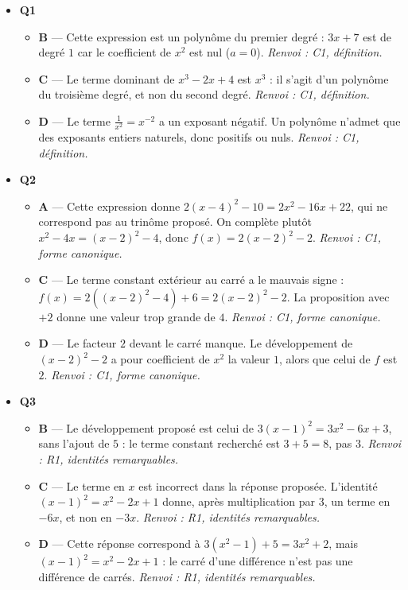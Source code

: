 \begin{itemize}
  \item \textbf{Q1}
  \begin{itemize}
    \item \textbf{B} — Cette expression est un polynôme du premier degré : $3x+7$ est de degré $1$ car le coefficient de $x^2$ est nul ($a=0$). \emph{Renvoi : C1, définition.}
    \item \textbf{C} — Le terme dominant de $x^3-2x+4$ est $x^3$ : il s’agit d’un polynôme du troisième degré, et non du second degré. \emph{Renvoi : C1, définition.}
    \item \textbf{D} — Le terme $\frac{1}{x^2}=x^{-2}$ a un exposant négatif. Un polynôme n’admet que des exposants entiers naturels, donc positifs ou nuls. \emph{Renvoi : C1, définition.}
  \end{itemize}
  \item \textbf{Q2}
  \begin{itemize}
    \item \textbf{A} — Cette expression donne $2(x-4)^2-10=2x^2-16x+22$, qui ne correspond pas au trinôme proposé. On complète plutôt $x^2-4x=(x-2)^2-4$, donc $f(x)=2(x-2)^2-2$. \emph{Renvoi : C1, forme canonique.}
    \item \textbf{C} — Le terme constant extérieur au carré a le mauvais signe : $f(x)=2((x-2)^2-4)+6=2(x-2)^2-2$. La proposition avec $+2$ donne une valeur trop grande de $4$. \emph{Renvoi : C1, forme canonique.}
    \item \textbf{D} — Le facteur $2$ devant le carré manque. Le développement de $(x-2)^2-2$ a pour coefficient de $x^2$ la valeur $1$, alors que celui de $f$ est $2$. \emph{Renvoi : C1, forme canonique.}
  \end{itemize}
  \item \textbf{Q3}
  \begin{itemize}
    \item \textbf{B} — Le développement proposé est celui de $3(x-1)^2=3x^2-6x+3$, sans l’ajout de $5$ : le terme constant recherché est $3+5=8$, pas $3$. \emph{Renvoi : R1, identités remarquables.}
    \item \textbf{C} — Le terme en $x$ est incorrect dans la réponse proposée. L’identité $(x-1)^2=x^2-2x+1$ donne, après multiplication par $3$, un terme en $-6x$, et non en $-3x$. \emph{Renvoi : R1, identités remarquables.}
    \item \textbf{D} — Cette réponse correspond à $3(x^2-1)+5=3x^2+2$, mais $(x-1)^2=x^2-2x+1$ : le carré d’une différence n’est pas une différence de carrés. \emph{Renvoi : R1, identités remarquables.}

\end{itemize}
\end{itemize}
